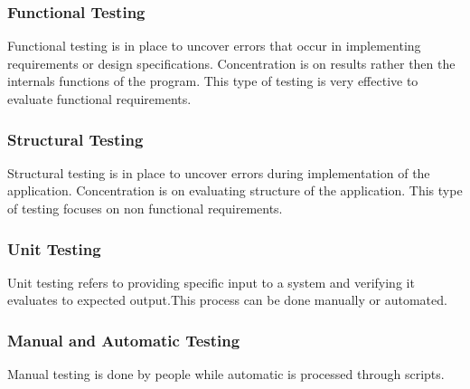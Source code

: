 \documentclass[12pt]{article}
\begin{document}
\subsubsection{Functional Testing}
Functional testing is in place to uncover errors that occur in implementing requirements or design specifications. Concentration is on results rather then the internals functions of the program. This type of testing is very effective to evaluate functional requirements.

\subsubsection{Structural Testing}
Structural testing is in place to uncover errors during implementation of the application. Concentration is on evaluating structure of the application. This type of testing focuses on non functional requirements.  

\subsubsection{Unit Testing}
Unit testing refers to providing specific input to a system and verifying it evaluates to expected output.This process can be done manually or automated.

\subsubsection{Manual and Automatic Testing}
Manual testing is done by people while automatic is processed through scripts. 
\end{document}
